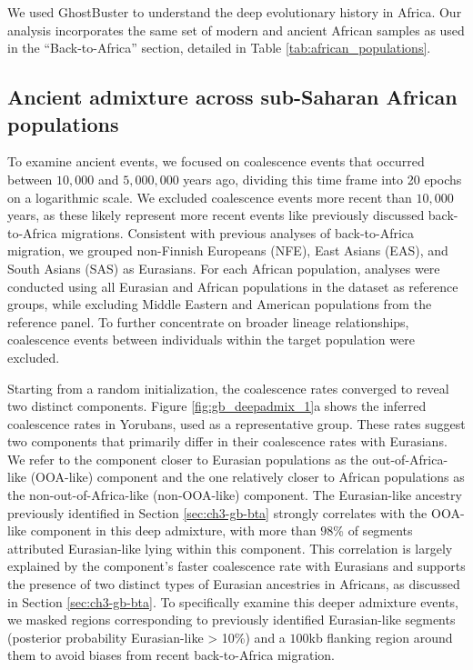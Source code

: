 We used GhostBuster to understand the deep evolutionary history in Africa. Our analysis incorporates the same set of modern and ancient African samples as used in the ``Back-to-Africa'' section, detailed in Table \ref{tab:african_populations}. 

\subsection{Ancient admixture across sub-Saharan African populations}

To examine ancient events, we focused on coalescence events that occurred between $10{,}000$ and $5{,}000{,}000$ years ago, dividing this time frame into 20 epochs on a logarithmic scale. We excluded coalescence events more recent than $10{,}000$ years, as these likely represent more recent events like previously discussed back-to-Africa migrations. Consistent with previous analyses of back-to-Africa migration, we grouped non-Finnish Europeans (NFE), East Asians (EAS), and South Asians (SAS) as Eurasians. For each African population, analyses were conducted using all Eurasian and African populations in the dataset as reference groups, while excluding Middle Eastern and American populations from the reference panel. To further concentrate on broader lineage relationships, coalescence events between individuals within the target population were excluded. 

Starting from a random initialization, the coalescence rates converged to reveal two distinct components. Figure \ref{fig:gb_deepadmix_1}a shows the inferred coalescence rates in Yorubans, used as a representative group. These rates suggest two components that primarily differ in their coalescence rates with Eurasians. We refer to the component closer to Eurasian populations as the out-of-Africa-like (OOA-like) component and the one relatively closer to African populations as the non-out-of-Africa-like (non-OOA-like) component. The Eurasian-like ancestry previously identified in Section \ref{sec:ch3-gb-bta} strongly correlates with the OOA-like component in this deep admixture, with more than $98$\% of segments attributed Eurasian-like lying within this component. This correlation is largely explained by the component's faster coalescence rate with Eurasians and supports the presence of two distinct types of Eurasian ancestries in Africans, as discussed in Section \ref{sec:ch3-gb-bta}. To specifically examine this deeper admixture events, we masked regions corresponding to previously identified Eurasian-like segments (posterior probability Eurasian-like > 10\%) and a $100$kb flanking region around them to avoid biases from recent back-to-Africa migration.

